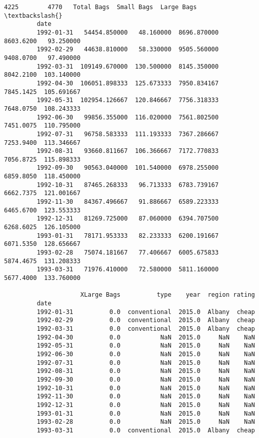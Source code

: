 \documentclass[11pt]{article}
\begin{document}
\begin{Verbatim}[commandchars=\\\{\}]
                              4225        4770   Total Bags  Small Bags  Large Bags  \textbackslash{}
         date                                                                         
         1992-01-31   54454.850000   48.160000  8696.870000   8603.6200   93.250000   
         1992-02-29   44638.810000   58.330000  9505.560000   9408.0700   97.490000   
         1992-03-31  109149.670000  130.500000  8145.350000   8042.2100  103.140000   
         1992-04-30  106051.898333  125.673333  7950.834167   7845.1425  105.691667   
         1992-05-31  102954.126667  120.846667  7756.318333   7648.0750  108.243333   
         1992-06-30   99856.355000  116.020000  7561.802500   7451.0075  110.795000   
         1992-07-31   96758.583333  111.193333  7367.286667   7253.9400  113.346667   
         1992-08-31   93660.811667  106.366667  7172.770833   7056.8725  115.898333   
         1992-09-30   90563.040000  101.540000  6978.255000   6859.8050  118.450000   
         1992-10-31   87465.268333   96.713333  6783.739167   6662.7375  121.001667   
         1992-11-30   84367.496667   91.886667  6589.223333   6465.6700  123.553333   
         1992-12-31   81269.725000   87.060000  6394.707500   6268.6025  126.105000   
         1993-01-31   78171.953333   82.233333  6200.191667   6071.5350  128.656667   
         1993-02-28   75074.181667   77.406667  6005.675833   5874.4675  131.208333   
         1993-03-31   71976.410000   72.580000  5811.160000   5677.4000  133.760000   
         
                     XLarge Bags          type    year  region rating  
         date                                                          
         1992-01-31          0.0  conventional  2015.0  Albany  cheap  
         1992-02-29          0.0  conventional  2015.0  Albany  cheap  
         1992-03-31          0.0  conventional  2015.0  Albany  cheap  
         1992-04-30          0.0           NaN  2015.0     NaN    NaN  
         1992-05-31          0.0           NaN  2015.0     NaN    NaN  
         1992-06-30          0.0           NaN  2015.0     NaN    NaN  
         1992-07-31          0.0           NaN  2015.0     NaN    NaN  
         1992-08-31          0.0           NaN  2015.0     NaN    NaN  
         1992-09-30          0.0           NaN  2015.0     NaN    NaN  
         1992-10-31          0.0           NaN  2015.0     NaN    NaN  
         1992-11-30          0.0           NaN  2015.0     NaN    NaN  
         1992-12-31          0.0           NaN  2015.0     NaN    NaN  
         1993-01-31          0.0           NaN  2015.0     NaN    NaN  
         1993-02-28          0.0           NaN  2015.0     NaN    NaN  
         1993-03-31          0.0  conventional  2015.0  Albany  cheap  
\end{Verbatim}
            
\end{document}
